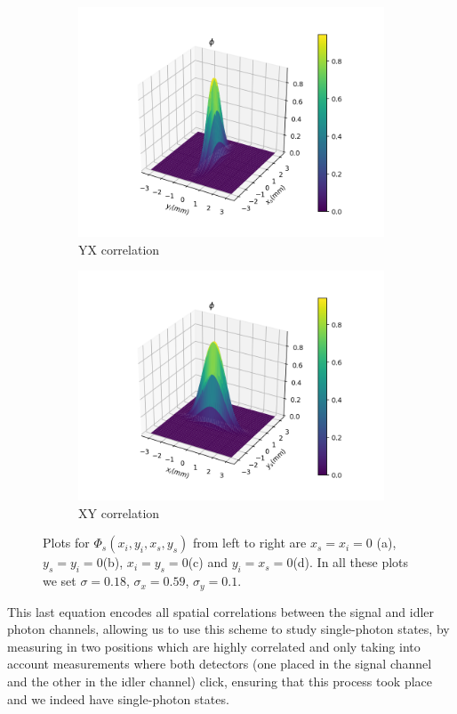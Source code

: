 \documentclass[12pt]{book}
\begin{document}
\begin{figure}[H]
\begin{subfigure}[b]{0.45\linewidth}
\includegraphics[width=\linewidth]{images/SPDC_yx.png}
\caption{YX correlation}
\end{subfigure}
\begin{subfigure}[b]{0.45\linewidth}
\includegraphics[width=\linewidth]{images/SPDC_xy.png}
\caption{XY correlation}
\end{subfigure}
\caption{Plots for $\Phi_{s}(x_{i},y_{i},x_{s},y_{s})$  from left to right are $x_{s}=x_{i}=0$ (a), $y_{s}=y_{i}=0$(b), $x_{i}=y_{s}=0$(c) and $y_{i}=x_{s}=0$(d). In all these plots we set $\sigma=0.18$, $\sigma_{x}=0.59$, $\sigma_{y}=0.1$.}
\label{SPDC}
\end{figure}


This last equation encodes all spatial correlations between the signal and idler photon channels, allowing us to use this scheme to study single-photon states, by measuring in two positions which are highly correlated and only taking into account measurements where both detectors (one placed in the signal channel and the other in the idler channel) click, ensuring that this process took place and we indeed have single-photon states.
\end{document}
